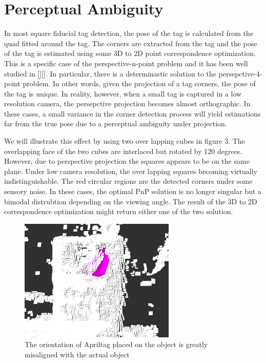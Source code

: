 \section{Perceptual Ambiguity}
\label{sec:problem}
In most square fiducial tag detection, the pose of the tag is calculated from the quad fitted around the tag. The corners are extracted from the tag and the pose of the tag is estimated using some 3D to 2D point correspondence optimization. This is a specific case of the perspective-n-point problem and it has been well studied in [][]. In particular, there is a determinastic solution to the persepctive-4-point problem. In other words, given the projection of a tag corners, the pose of the tag is unique. In reality, however,  when a small tag is captured in a low resolution camera, the persepctive projection becomes almost orthographic. In these cases, a small variance in the corner detection process will yield estimations far from the true pose due to a perceptual ambiguity under projection. 

We will illustrate this effect by using two over lapping cubes in figure 3. The overlapping face of the two cubes are interlaced but rotated by 120 degrees. However, due to perspective projection the squares appears to be on the same plane. Under low camera resolution, the over lapping squares becoming virtually indistinguishable. The red circular regions are the detected corners under some sensory noise. In these cases, the optimal PnP solution is no longer singular but a bimodal distrubtion depending on the viewing angle. The result of the 3D to 2D correspondence optimization might return either one of the two solution.
\begin{figure}
\centering
\includegraphics[width=\columnwidth]{figs/mismatch_tag}
\caption{The orientation of Apriltag placed on the object is greatly misaligned with the actual object}
\label{fig:calib}
\end{figure}

